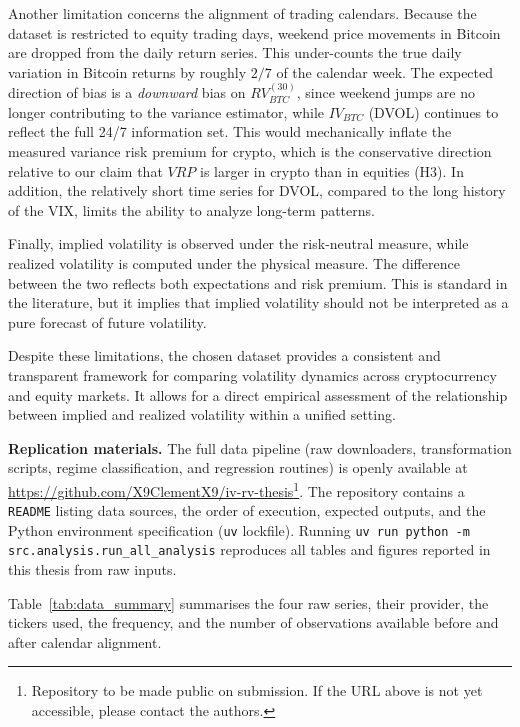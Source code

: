 \documentclass[11pt,a4paper,openany]{report}
\begin{document}
Another limitation concerns the alignment of trading calendars. Because
the dataset is restricted to equity trading days, weekend price
movements in Bitcoin are dropped from the daily return series. This
under-counts the true daily variation in Bitcoin returns by roughly
$2/7$ of the calendar week. The expected direction of bias is a
\emph{downward} bias on $RV^{(30)}_{BTC}$, since weekend jumps are no
longer contributing to the variance estimator, while $IV_{BTC}$ (DVOL)
continues to reflect the full 24/7 information set. This would
mechanically inflate the measured variance risk premium for crypto,
which is the conservative direction relative to our claim that $VRP$ is
larger in crypto than in equities (H3). In addition, the relatively
short time series for DVOL, compared to the long history of the VIX,
limits the ability to analyze long-term patterns.

Finally, implied volatility is observed under the risk-neutral measure,
while realized volatility is computed under the physical measure. The
difference between the two reflects both expectations and risk premium.
This is standard in the literature, but it implies that implied
volatility should not be interpreted as a pure forecast of future
volatility.

Despite these limitations, the chosen dataset provides a consistent and
transparent framework for comparing volatility dynamics across
cryptocurrency and equity markets. It allows for a direct empirical
assessment of the relationship between implied and realized volatility
within a unified setting.

\textbf{Replication materials.} The full data pipeline (raw
downloaders, transformation scripts, regime classification, and
regression routines) is openly available at
\url{https://github.com/X9ClementX9/iv-rv-thesis}\footnote{Repository
to be made public on submission. If the URL above is not yet accessible,
please contact the authors.}. The repository contains a \texttt{README}
listing data sources, the order of execution, expected outputs, and the
Python environment specification ({\tt uv} lockfile). Running
\texttt{uv run python -m src.analysis.run\_all\_analysis} reproduces all
tables and figures reported in this thesis from raw inputs.

Table~\ref{tab:data_summary} summarises the four raw series, their
provider, the tickers used, the frequency, and the number of
observations available before and after calendar alignment.
\end{document}
